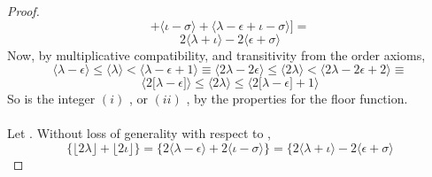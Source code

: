 \documentclass[a4paper, 12pt]{article}
\theoremstyle{plain}
\begin{document}
\begin{proof}
\begin{equation*}
                +
            \big \langle \iota - \sigma \big \rangle
                +
            \big \langle \lambda - \epsilon + \iota - \sigma \big \rangle
        \Big]
            =
    \end{equation*}
    \begin{equation*}
        2 \big \langle \lambda + \iota \big \rangle 
            -
        2 \big \langle \epsilon + \sigma \big \rangle
    \end{equation*}
    Now, by multiplicative compatibility, 
    and transitivity from the order axioms,
    \begin{equation*}
        \Big \langle \lambda - \epsilon \Big \rangle
            \leq 
        \Big \langle \lambda \Big \rangle
            < 
        \Big \langle \lambda - \epsilon + 1 \Big \rangle
            \equiv
        \Big \langle 2 \lambda - 2\epsilon \Big \rangle
            \leq 
        \Big \langle 2 \lambda \Big \rangle
            < 
        \Big \langle 2 \lambda - 2\epsilon + 2 \Big \rangle
            \equiv
    \end{equation*}
    \begin{equation*}
        \Big \langle 2 \big[ \lambda - \epsilon \big] \Big \rangle
            \leq
        \Big \langle 2 \lambda \Big \rangle
            \leq
        \Big \langle 2 \big[ \lambda - \epsilon \big] + 1 \Big \rangle
    \end{equation*}
    So \bm{$
        \big \lfloor 2 \lambda \big \rfloor
    $}
    is the integer
    $(i)$ \bm{$
        2 \big \langle \lambda - \epsilon \big \rangle
    $}, 
    or $(ii)$ , by the properties for the floor function.
    \\ \\
     Let \bm{$
        \big \lfloor 2 \lambda \big \rfloor 
            = 
        2 \big \langle \lambda - \epsilon \big \rangle
    $}. 
    Without loss of generality with respect to \bm{$\iota$},
    \begin{equation*}
        \Big \{ 
            \big \lfloor 2 \lambda \big \rfloor 
                + 
            \big \lfloor 2 \iota \big \rfloor
        \Big \}
            =
        \Big \{
            2 \big \langle \lambda - \epsilon \big \rangle 
                + 
            2 \big \langle \iota - \sigma \big \rangle
        \Big \}
            =
        \Big \{
            2 \big \langle \lambda + \iota \big \rangle
                - 
            2 \big \langle \epsilon + \sigma \big \rangle

\end{equation*}
\end{proof}
\end{document}
